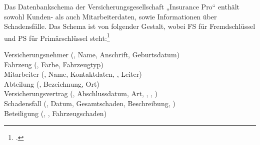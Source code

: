\documentclass{bschlangaul-aufgabe}
\begin{document}

Das Datenbankschema der Versicherungsgesellschaft „Insurance Pro“ enthält
sowohl Kunden- als auch Mitarbeiterdaten, sowie Informationen über
Schadensfälle. Das Schema ist von folgender Gestalt, wobei FS für
Fremdschlüssel und PS für Primärschlüssel steht:\footcite[Aufgabe 4: SQL
(Check-Up)]{db:ab:4}

\bigskip

{
\ttfamily
\noindent
Versicherungsnehmer (, Name, Anschrift, Geburtsdatum)\\

\noindent
Fahrzeug (, Farbe, Fahrzeugtyp)\\

\noindent
Mitarbeiter (, Name, Kontaktdaten, ,
Leiter)\\

\noindent
Abteilung (, Bezeichnung, Ort)\\

\noindent
Versicherungsvertrag (, Abschlussdatum, Art,
, ,
)\\

\noindent
Schadensfall (, Datum, Gesamtschaden, Beschreibung,
)\\

\noindent
Beteiligung (, ,
Fahrzeugschaden)}

\bigskip
\end{document}
